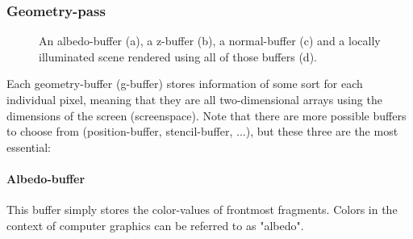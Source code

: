 \documentclass{ACGSeminar}
\begin{document}
	\subsubsection{Geometry-pass}
		\begin{figure}[]
			\caption{An albedo-buffer (a), a z-buffer (b), a normal-buffer (c) and a locally illuminated scene rendered using all of those buffers (d).}
			\label{fig:deferred_shading}%
		\end{figure}

		Each geometry-buffer (g-buffer) stores information of some sort for each individual pixel, meaning that they are all two-dimensional arrays using the dimensions of the screen (screenspace). Note that there are more possible buffers to choose from (position-buffer, stencil-buffer, ...), but these three are the most essential:
		\paragraph{Albedo-buffer}%
			This buffer simply stores the color-values of frontmost fragments. Colors in the context of computer graphics can be referred to as "albedo".%
\end{document}

